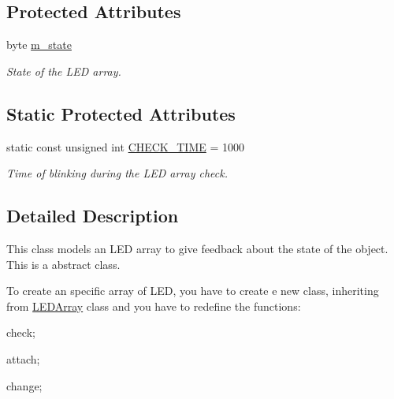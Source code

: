 \subsection*{Protected Attributes}
\begin{DoxyCompactItemize}
\item 
\hypertarget{classsmrtobj_1_1io_1_1_l_e_d_array_aeb865e8cf9707498c97c57198da9c1a4}{}byte \hyperlink{classsmrtobj_1_1io_1_1_l_e_d_array_aeb865e8cf9707498c97c57198da9c1a4}{m\+\_\+state}\label{classsmrtobj_1_1io_1_1_l_e_d_array_aeb865e8cf9707498c97c57198da9c1a4}

\begin{DoxyCompactList}\small\item\em State of the L\+E\+D array. \end{DoxyCompactList}\end{DoxyCompactItemize}
\subsection*{Static Protected Attributes}
\begin{DoxyCompactItemize}
\item 
\hypertarget{classsmrtobj_1_1io_1_1_l_e_d_array_aec57c9c0fbdaa8250090f151e0f51d28}{}static const unsigned int \hyperlink{classsmrtobj_1_1io_1_1_l_e_d_array_aec57c9c0fbdaa8250090f151e0f51d28}{C\+H\+E\+C\+K\+\_\+\+T\+I\+M\+E} = 1000\label{classsmrtobj_1_1io_1_1_l_e_d_array_aec57c9c0fbdaa8250090f151e0f51d28}

\begin{DoxyCompactList}\small\item\em Time of blinking during the L\+E\+D array check. \end{DoxyCompactList}\end{DoxyCompactItemize}


\subsection{Detailed Description}
This class models an L\+E\+D array to give feedback about the state of the object. This is a abstract class.

To create an specific array of L\+E\+D, you have to create e new class, inheriting from \hyperlink{classsmrtobj_1_1io_1_1_l_e_d_array}{L\+E\+D\+Array} class and you have to redefine the functions\+:
\begin{DoxyItemize}
\item check;
\item attach;
\item change;
\end{DoxyItemize}

